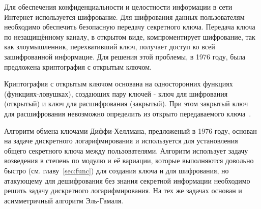 \documentclass[times,specification,annotation]{itmo-student-thesis}
\begin{document}



\researchpublications{
\begin{refsection}
\nocite{kri20}
\printannobibliography
\end{refsection}
}


\tableofcontents

\startprefacepage

Для обеспечения конфиденциальности и целостности информации в сети Интернет используется шифрование.
Для шифрования данных пользователям необходимо обеспечить безопасную передачу секретного ключа.
Передача ключа по незащищённому каналу, в открытом виде, компроментирует шифрование, так как
злоумышленник, перехвативший ключ, получает доступ ко всей зашифрованной информацие.
Для решения этой проблемы, в 1976 году, была предложена  криптография с открытым ключом.

Криптография с открытым ключом основана на односторонних функциях (функциях-ловушках),
создающих пару ключей - ключ для шифрования (открытый) и ключ для расшифрования (закрытый).
При этом закрытый ключ для расшифрования  невозможно определить из открыто передаваемого ключа~\cite{dif77}.

Алгоритм обмена ключами Диффи-Хеллмана, предложеный в 1976 году, основан на задаче дискретного логарифмирования
и используется для установления общего секретного ключа между пользователями.
Алгоритм  использует задачу возведения в степень по модулю и её вариации, которые выполняются довольно быстро
(см. главу~\ref{sec:func}) для создания ключа и для шифрования, но атакующему для дешифрования без знания секретной
информации необходимо решить задачу дискретного логарифмирования.
На тех же задачах основан и асимметричный алгоритм Эль-Гамаля.
\end{document}
